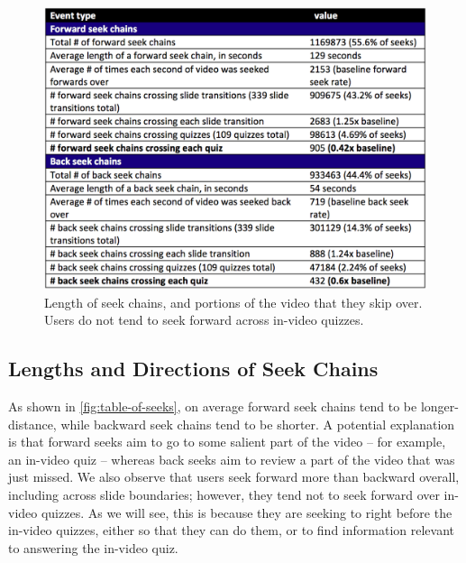 \documentclass{sigchi}
\begin{document}



\begin{figure}
\includegraphics[width=1.0\columnwidth]{table-of-seeks}
\caption{Length of seek chains, and portions of the video that they skip over. Users do not tend to seek forward across in-video quizzes.}
\label{fig:table-of-seeks}
\end{figure}

\subsection{Lengths and Directions of Seek Chains}

As shown in \autoref{fig:table-of-seeks}, on average forward seek chains tend to be longer-distance, while backward seek chains tend to be shorter. A potential explanation is that forward seeks aim to go to some salient part of the video -- for example, an in-video quiz -- whereas back seeks aim to review a part of the video that was just missed. We also observe that users seek forward more than backward overall, including across slide boundaries; however, they tend not to seek forward over in-video quizzes. As we will see, this is because they are seeking to right before the in-video quizzes, either so that they can do them, or to find information relevant to answering the in-video quiz.
\end{document}

